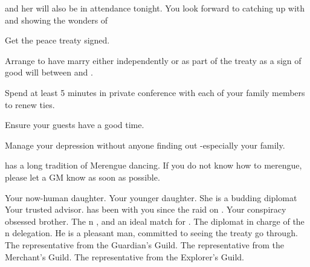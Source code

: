 \documentclass[char]{NeptuneBall}
\begin{document}
\cAriel{} and her \cWillow{\offspring} \cWillow{} will also be in attendance tonight. You look forward to catching up with \cAriel{} and showing \cWillow{} the wonders of \pAtlantis{}

\begin{itemz}[Goals]
  \item Get the peace treaty signed.
  \item Arrange to have \cPrincess{} marry \cPrince{} either independently or as part of the treaty as a sign of good will between \pAtlantis{} and \pPacifica{}.
  \item Spend at least 5 minutes in private conference with each of your family members to renew ties.
  \item Ensure your guests have a good time.
  \item Manage your depression without anyone finding out -especially your family.
\end{itemz}

\begin{itemz}[Notes]
  \item \pAtlantis{} has a long tradition of Merengue dancing. If you do not know how to merengue, please let a GM know as soon as possible.
\end{itemz}

\begin{contacts}
  \contact{\cAriel{}} Your now-human daughter.
  \contact{\cPrincess{}} Your younger daughter. She is a budding diplomat
  \contact{\cManta{}} Your trusted advisor. \cManta{\They{}} has been with you since the raid on \pPacifica{}.
  \contact{\cPlant{}} Your conspiracy obsessed brother.
  \contact{\cPrince{}} The \pPacifica{}n \cPrince{\prince}, and an ideal match for \cPrincess{}.
  \contact{\cDiplomat{}} The diplomat in charge of the \pPacifica{}n delegation. He is a pleasant man, committed to seeing the treaty go through.
  \contact{\cGeneral{}} The representative from the Guardian's Guild.
  \contact{\cSlave{}} The representative from the Merchant's Guild.
  \contact{\cPriest{}} The representative from the Explorer's Guild.
\end{contacts}
\end{document}
